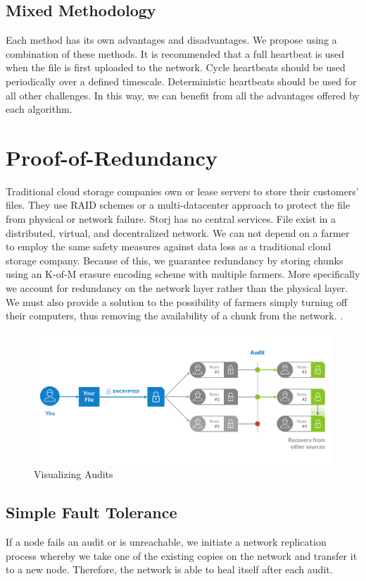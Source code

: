 \documentclass[a4paper,10pt]{article}
\begin{document}
\subsection{Mixed Methodology}
Each method has its own advantages and disadvantages. We propose using a combination of these methods. It is recommended that a full heartbeat is used when the file is first uploaded to the network. Cycle heartbeats should be used periodically over a defined timescale. Deterministic heartbeats should be used for all other challenges. In this way, we can benefit from all the advantages offered by each algorithm. 

\section{Proof-of-Redundancy}
Traditional cloud storage companies own or lease servers to store their customers’ files. They use RAID schemes or a multi-datacenter approach to protect the file from physical or network failure. Storj has no central services. File exist in a distributed, virtual, and decentralized network. We can not depend on a farmer to employ the same safety measures against data loss as a traditional cloud storage company. Because of this, we guarantee redundancy by storing chunks using an K-of-M erasure encoding scheme with multiple farmers. More specifically we account for redundancy on the network layer rather than the physical layer. We must also provide a solution to the possibility of farmers simply turning off their computers, thus removing the availability of a chunk from the network. . \\

\begin{figure}[h!]
\centering
\includegraphics[width=\linewidth]{5}
\caption{Visualizing Audits}
\end{figure}

\subsection{Simple Fault Tolerance}
If a node fails an audit or is unreachable, we initiate a network replication process whereby we take one of the existing copies on the network and transfer it to a new node. Therefore, the network is able to heal itself after each audit.\\
\end{document}
